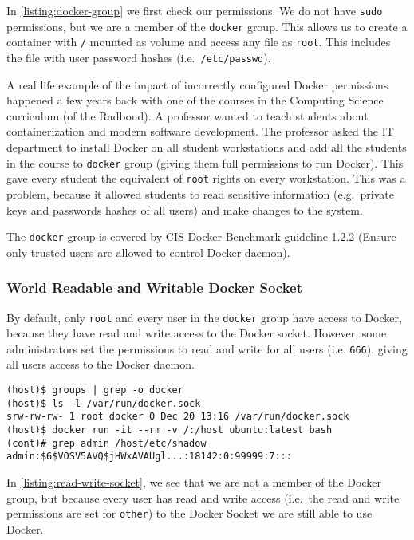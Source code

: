 In \autoref{listing:docker-group} we first check our permissions. We do not have \lstinline{sudo} permissions, but we are a member of the \lstinline{docker} group. This allows us to create a container with \lstinline{/} mounted as volume and access any file as \lstinline{root}. This includes the file with user password hashes (i.e.\ \lstinline{/etc/passwd}).

\medskip

A real life example of the impact of incorrectly configured Docker permissions happened a few years back with one of the courses in the Computing Science curriculum (of the Radboud). A professor wanted to teach students about containerization and modern software development. The professor asked the IT department to install Docker on all student workstations and add all the students in the course to \lstinline{docker} group (giving them full permissions to run Docker). This gave every student the equivalent of \lstinline{root} rights on every workstation. This was a problem, because it allowed students to read sensitive information (e.g.\ private keys and passwords hashes of all users) and make changes to the system.

\medskip

The \lstinline{docker} group is covered by CIS Docker Benchmark guideline 1.2.2 (Ensure only trusted users are allowed to control Docker daemon).

\subsubsection{World Readable and Writable Docker Socket}
By default, only \lstinline{root} and every user in the \lstinline{docker} group have access to Docker, because they have read and write access to the Docker socket. However, some administrators set the permissions to read and write for all users (i.e. \lstinline{666}), giving all users access to the Docker daemon.

\begin{lstlisting}[caption={All users can use Docker if they have read and write access to the Socket},captionpos=b,label={listing:read-write-socket}]
(host)$ groups | grep -o docker
(host)$ ls -l /var/run/docker.sock
srw-rw-rw- 1 root docker 0 Dec 20 13:16 /var/run/docker.sock
(host)$ docker run -it --rm -v /:/host ubuntu:latest bash
(cont)# grep admin /host/etc/shadow
admin:$6$VOSV5AVQ$jHWxAVAUgl...:18142:0:99999:7:::
\end{lstlisting}

In \autoref{listing:read-write-socket}, we see that we are not a member of the Docker group, but because every user has read and write access (i.e.\ the read and write permissions are set for \lstinline{other}) to the Docker Socket we are still able to use Docker.

